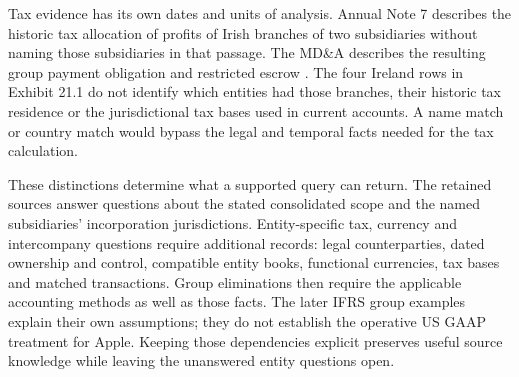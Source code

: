 Tax evidence has its own dates and units of analysis. Annual Note 7 describes
the historic tax allocation of profits of Irish branches of two subsidiaries
without naming those subsidiaries in that passage. The MD\&A describes the
resulting group payment obligation and restricted escrow
\citep[Note 7, printed pp.~39--40; State Aid Decision Tax Payable, printed p.~26]{apple2024}.
The four Ireland rows in Exhibit 21.1 do not identify which entities had those
branches, their historic tax residence or the jurisdictional tax bases used
in current accounts. A name match or country match would bypass the legal
and temporal facts needed for the tax calculation.

These distinctions determine what a supported query can return. The retained
sources answer questions about the stated consolidated scope and the named
subsidiaries' incorporation jurisdictions. Entity-specific tax, currency and
intercompany questions require additional records: legal counterparties,
dated ownership and control, compatible entity books, functional currencies,
tax bases and matched transactions. Group eliminations then require the
applicable accounting methods as well as those facts. The later IFRS group
examples explain their own assumptions; they do not establish the operative
US GAAP treatment for Apple. Keeping those dependencies explicit preserves
useful source knowledge while leaving the unanswered entity questions open.
